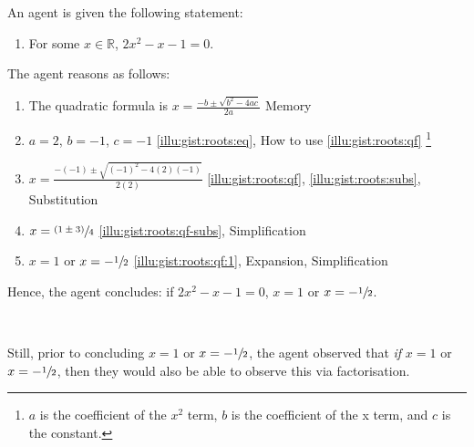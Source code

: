 \begin{note}
  \begin{scenario}
    \label{illu:gist:roots}
    An agent is given the following statement:

    \begin{enumerate}[label=\arabic*., ref=(\arabic*)]
    \item
      \label{illu:gist:roots:eq}
      For some \(x \in \mathbb{R}\), \(2x^{2} - x - 1 = 0\).
    \end{enumerate}

    The agent reasons as follows:

    \begin{enumerate}[label=\arabic*., ref=(\arabic*), resume, itemsep=.125em]
    \item
      \label{illu:gist:roots:qf}
      The quadratic formula is \(x = \frac{-b \pm \sqrt{b^{2} - 4ac}}{2a}\) \hfill Memory
    \item
      \label{illu:gist:roots:subs}
      \(a = 2\), \(b = -1\), \(c = -1\) \hfill \ref{illu:gist:roots:eq}, How to use \ref{illu:gist:roots:qf}%
      \footnote{
        \(a\) is the coefficient of the \(x^{2}\) term, \(b\) is the coefficient of the x term, and \(c\) is the constant.
      }
    \item
      \label{illu:gist:roots:qf-subs}
      \(x = \frac{-(-1) \pm \sqrt{(-1)^{2} - 4(2)(-1)}}{2(2)}\) \hfill \ref{illu:gist:roots:qf}, \ref{illu:gist:roots:subs}, Substitution
    \item
      \label{illu:gist:roots:qf:1}
      \(x = \sfrac{(1 \pm 3)}{4}\) \hfill \ref{illu:gist:roots:qf-subs}, Simplification
    \item
      \label{illu:gist:roots:qf:done}
      \(x = 1\) or \(x = -\sfrac{1}{2}\) \hfill \ref{illu:gist:roots:qf:1}, Expansion, Simplification
    \end{enumerate}
    Hence, the agent concludes: if \(2x^{2} - x - 1 = 0\), \(x = 1\) or \(x = -\sfrac{1}{2}\).

    \mbox{ }

    Still, prior to concluding \(x = 1\) or \(x = -\sfrac{1}{2}\), the agent observed that \emph{if} \(x = 1\) or \(x = -\sfrac{1}{2}\), then they would also be able to observe this via factorisation.
  \end{scenario}


\end{note}
